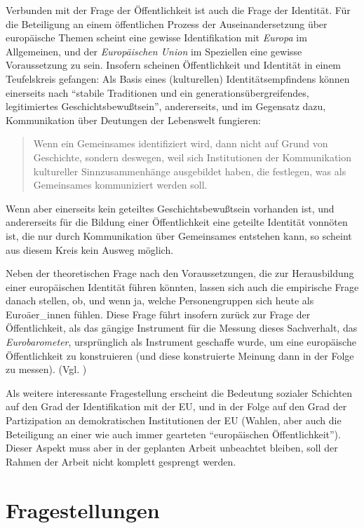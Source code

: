 \documentclass[a4paper, german, oneside]{scrartcl}
\begin{document}
Verbunden mit der Frage der Öffentlichkeit ist auch die Frage der Identität. Für die Beteiligung an einem öffentlichen Prozess der Auseinandersetzung über europäische Themen scheint eine gewisse Identifikation mit \emph{Europa} im Allgemeinen, und der \emph{Europäischen Union} im Speziellen eine gewisse Voraussetzung zu sein. Insofern scheinen Öffentlichkeit und Identität in einem Teufelskreis gefangen: Als Basis eines (kulturellen) Identitätsempfindens können einerseits nach \textcite[28]{segers_konstruktion_1999} \enquote{stabile Traditionen und ein generationsübergreifendes, legitimiertes Geschichtsbewußtsein}, andererseits, und im Gegensatz dazu, Kommunikation über Deutungen der Lebenswelt fungieren:  \blockquote[{\cite[160]{eder_integration_1999}}]{Wenn ein Gemeinsames identifiziert wird, dann nicht auf Grund von Geschichte, sondern deswegen, weil sich Institutionen der Kommunikation kultureller Sinnzusammenhänge ausgebildet haben, die festlegen, was als Gemeinsames kommuniziert werden soll.} Wenn aber einerseits kein geteiltes Geschichtsbewußtsein vorhanden ist, und andererseits für die Bildung einer Öffentlichkeit eine geteilte Identität vonnöten ist, die nur durch Kommunikation über Gemeinsames entstehen kann, so scheint aus diesem Kreis kein Ausweg möglich.

Neben der theoretischen Frage nach den Voraussetzungen, die zur Herausbildung einer europäischen Identität führen könnten, lassen sich auch die empirische Frage danach stellen, ob, und wenn ja, welche Personengruppen sich heute als Euroäer\_innen fühlen. Diese Frage führt insofern zurück zur Frage der Öffentlichkeit, als das gängige Instrument für die Messung dieses Sachverhalt, das \emph{Eurobarometer}, ursprünglich als Instrument geschaffe wurde, um eine europäische Öffentlichkeit zu konstruieren (und diese konstruierte Meinung dann in der Folge zu messen).
 (Vgl. \textcite[542]{weichbold_eurobarometer_2009})


Als weitere interessante Fragestellung erscheint die Bedeutung sozialer Schichten auf den Grad der Identifikation mit der EU, und in der Folge auf den Grad der Partizipation an demokratischen Institutionen der EU (Wahlen, aber auch die Beteiligung an einer wie auch immer gearteten \enquote{europäischen Öffentlichkeit}). Dieser Aspekt muss aber in der geplanten Arbeit unbeachtet bleiben, soll der Rahmen der Arbeit nicht komplett gesprengt werden.

\section{Fragestellungen}
\end{document}
